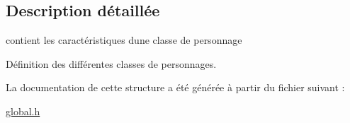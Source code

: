 \subsection{Description détaillée}
contient les caractéristiques d\textquotesingle{}une classe de personnage 

Définition des différentes classes de personnages. 

La documentation de cette structure a été générée à partir du fichier suivant \+:\begin{DoxyCompactItemize}
\item 
\hyperlink{a00022}{global.\+h}\end{DoxyCompactItemize}
